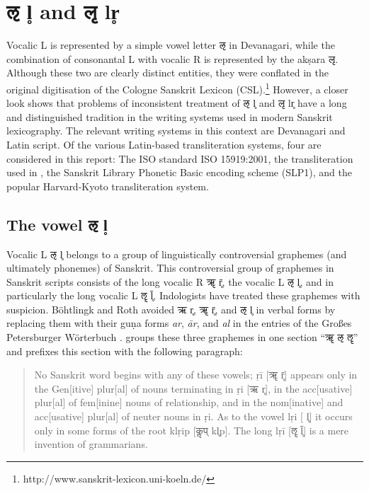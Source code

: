 \section{{\devhmfont ऌ} l̥ and {\devhmfont लृ} lr̥}

Vocalic L is represented by a simple vowel letter {\devfont ऌ} in Devanagari, while the combination of consonantal L with vocalic R is represented by the akṣara {\devfont लृ}. Although these two are clearly distinct entities, they were conflated in the original digitisation of the Cologne Sanskrit Lexicon (CSL).\footnote{http://www.sanskrit-lexicon.uni-koeln.de/} However, a closer look shows that problems of inconsistent treatment of {\devfont ऌ} l̥ and {\devfont लृ} lr̥ have a long and distinguished tradition in the writing systems used in modern Sanskrit lexicography. The relevant writing systems in this context are Devanagari and Latin script. Of the various Latin-based transliteration systems, four are considered in this report: The ISO standard ISO 15919:2001, the transliteration used in \citet{mw72,mw}, the Sanskrit Library Phonetic Basic encoding scheme (SLP1), and the popular Harvard-Kyoto transliteration system.

\subsection{The vowel {\devhmfont ऌ} l̥}

Vocalic L {\devfont ऌ} l̥  belongs to a group of linguistically controversial graphemes (and ultimately phonemes) of Sanskrit. This controversial group of graphemes in Sanskrit scripts consists of the long vocalic R {\devfont ॠ} r̥̄, the vocalic L {\devfont ऌ} l̥, and in particularly the long vocalic L {\devfont ॡ} l̥̄. Indologists have treated these graphemes with suspicion. Böhtlingk and Roth avoided  {\devfont ऋ} r̥, {\devfont ॠ} r̥̄, and {\devfont ऌ} l̥ in verbal forms by replacing them with their guṇa forms \emph{ar}, \emph{ār}, and \emph{al} in the entries of the Großes Petersburger Wörterbuch \citep{pwg}. \citet{mw72} groups these three graphemes in one section “{\devfont ॠ} {\devfont ऌ} {\devfont ॡ}” and prefixes this section with the following paragraph:

\begin{quote}
No Sanskrit word begins with any of these vowels; ṛī [{\devfont ॠ} r̥̄] appears only in the Gen[itive] plur[al] of nouns terminating in ṛi [{\devfont ऋ} r̥], in the acc[usative] plur[al] of fem[inine] nouns of relationship, and in the nom[inative] and acc[usative] plur[al] of neuter nouns in ṛi. As to the vowel lṛi [{} l̥] it occurs only in some forms of the root klṛip [{\devfont कॢप्} kl̥p]. The long lṛī [{\devfont ॡ} l̥̄] is a mere invention of grammarians.	
\end{quote}


